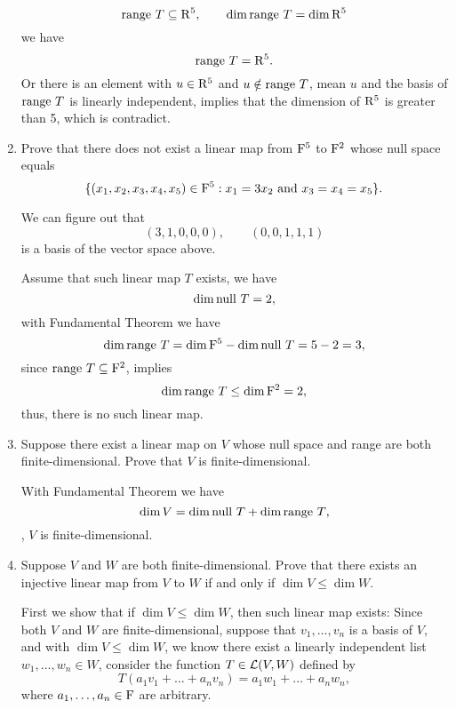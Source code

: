 \begin{enumerate}
\begin{solution}
            \[ \text{range}~T \subseteq \mathrm{R}^5, \qquad \dim{\text{range}~T} = \dim{\mathrm{R}^5} \]
            we have 
            \[ \text{range}~T = \mathrm{R}^5 .\]
            Or there is an element with $u \in \mathrm{R}^5$ and $u \notin \text{range}~T$, mean $u$ and the basis of $\text{range}~T$ is linearly independent,
            implies that the dimension of $\mathrm{R}^5$ is greater than 5, which is contradict.
        \end{solution}
    \item Prove that there does not exist a linear map from $\mathrm{F}^5$ to $\mathrm{F}^2$ whose null space equals
        \[ \{ (x_1, x_2, x_3, x_4, x_5) \in \mathrm{F}^5: x_1 = 3x_2 \text{ and } x_3 = x_4 = x_5 \}.\]
        \begin{solution}
            We can figure out that 
            \[ (3,1,0,0,0), \qquad (0,0,1,1,1) \]
            is a basis of the vector space above.

            Assume that such linear map $T$ exists, we have 
            \[ \dim{\text{null}~T} = 2, \]
            with Fundamental Theorem we have 
            \[ \dim{\text{range}~T} = \dim{\mathrm{F}^5} - \dim{\text{null}~T} = 5 - 2 = 3 ,\]
            since $\text{range}~T \subseteq \mathrm{F}^2$, implies 
            \[ \dim{\text{range}~T} \leq \dim{\mathrm{F}^2} = 2, \]
            thus, there is no such linear map.
        \end{solution}
    \item Suppose there exist a linear map on $V$ whose null space and range are both finite-dimensional. Prove 
        that $V$ is finite-dimensional.
        \begin{solution}
            With Fundamental Theorem we have 
            \[ \dim{V} = \dim{\text{null}~T} + \dim{\text{range}~T} ,\]
            \ie, $V$ is finite-dimensional.
        \end{solution}
    \item Suppose $V$ and $W$ are both finite-dimensional. Prove that there exists an injective linear map from 
        $V$ to $W$ if and only if $\dim{V} \leq \dim{W}$.
        \begin{solution}
            First we show that if $\dim{V} \leq \dim{W}$, then such linear map exists:
            Since both $V$ and $W$ are finite-dimensional, suppose that $v_1, \ldots, v_n$ is a basis of $V$, 
            and with $\dim{V} \leq \dim{W}$, we know there exist a linearly independent list $w_1,\ldots,w_n \in W$,
            consider the function $T \in \mathcal{L}(V, W)$ defined by 
            \[ T(a_1v_1 + \dots + a_nv_n) = a_1w_1 + \dots + a_nw_n ,\]
            where $a_1, \ldots, a_n \in \mathrm{F}$ are arbitrary.


\end{solution}
\end{enumerate}
